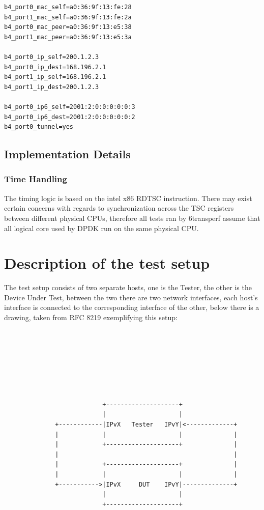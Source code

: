 \documentclass[a4paper,12p,titlepage]{article}
\begin{document}
\begin{lstlisting}
b4_port0_mac_self=a0:36:9f:13:fe:28
b4_port1_mac_self=a0:36:9f:13:fe:2a
b4_port0_mac_peer=a0:36:9f:13:e5:38
b4_port1_mac_peer=a0:36:9f:13:e5:3a

b4_port0_ip_self=200.1.2.3
b4_port0_ip_dest=168.196.2.1
b4_port1_ip_self=168.196.2.1
b4_port1_ip_dest=200.1.2.3

b4_port0_ip6_self=2001:2:0:0:0:0:0:3
b4_port0_ip6_dest=2001:2:0:0:0:0:0:2
b4_port0_tunnel=yes
\end{lstlisting}

\subsection{Implementation Details}
\subsubsection{Time Handling}

The timing logic is based on the intel x86 RDTSC instruction. There may exist certain concerns with regards to synchronization across the TSC  registers between different physical CPUs, therefore all tests ran by 6transperf assume that all logical core used by DPDK run on the same physical CPU.

\section{Description of the test setup}
The test setup consists of two separate hosts, one is the Tester, the other is the Device Under Test, between the two there are two network interfaces, each host’s interface is connected to the corresponding interface of the other, below there is a drawing, taken from RFC 8219 exemplifying this setup:

\begin{lstlisting}[basicstyle=\tiny]







                           +--------------------+
                           |                    |
              +------------|IPvX   Tester   IPvY|<-------------+
              |            |                    |              |
              |            +--------------------+              |
              |                                                |
              |            +--------------------+              |
              |            |                    |              |
              +----------->|IPvX     DUT    IPvY|--------------+
                           |                    |
                           +--------------------+

\end{lstlisting}
\end{document}
